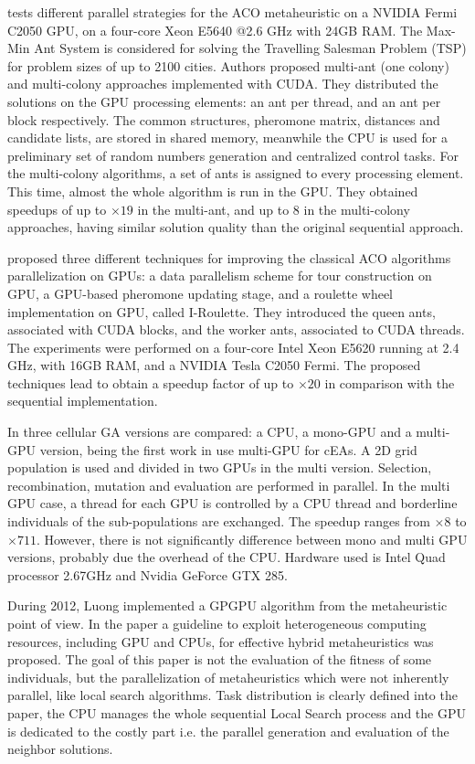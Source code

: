 \documentclass[Afour,sageh,times]{sagej}
\begin{document}
\cite{ACO-on-GPU_Develacq} tests different parallel strategies for the ACO metaheuristic on a NVIDIA Fermi C2050 GPU, on a four-core Xeon E5640 @2.6 GHz with 24GB RAM. The Max-Min Ant System is considered for solving the Travelling Salesman Problem (TSP) for problem sizes of up to 2100 cities. Authors proposed multi-ant (one colony) and multi-colony approaches implemented with CUDA. They distributed the solutions on the GPU processing elements: an ant per thread, and an ant per block respectively. The common structures, pheromone matrix, distances and candidate lists, are stored in shared memory, meanwhile the CPU is used for a preliminary set of random numbers generation and centralized control tasks. For the multi-colony algorithms, a set of ants is assigned to every processing element. This time, almost the whole algorithm is run in the GPU. They obtained speedups of up to $\times19$ in the multi-ant, and up to 8 in the multi-colony approaches, having similar solution quality than the original sequential approach.

\cite{Cecilia201342} proposed three different techniques for improving the classical ACO algorithms parallelization on GPUs: a data parallelism scheme for tour construction on GPU, a GPU-based pheromone updating stage, and a roulette wheel implementation on GPU, called I-Roulette. They introduced the queen ants, associated with CUDA blocks, and the worker ants, associated to CUDA threads. The experiments were performed on a four-core Intel Xeon E5620 running at 2.4 GHz, with 16GB RAM, and a NVIDIA Tesla C2050 Fermi. The proposed techniques lead to obtain a speedup factor of up to $\times20$ in comparison with the sequential implementation.

In \citep{5586530} three cellular GA versions are compared: a CPU, a mono-GPU and a multi-GPU version, being the first work in use multi-GPU for cEAs. A 2D grid population is used and divided in two GPUs in the multi version. Selection, recombination, mutation and evaluation are performed in parallel. In the multi GPU case, a thread for each GPU is controlled by a CPU thread and borderline individuals of the sub-populations are exchanged. The speedup ranges from $\times8$ to $\times711$. However, there is not significantly difference between mono and multi GPU versions, probably due the overhead of the CPU. Hardware used is Intel Quad processor 2.67GHz and Nvidia GeForce GTX 285.



During 2012, Luong \cite{luongMetaheuristicsPpsn2012} implemented a GPGPU algorithm from the metaheuristic point of view. In the paper a guideline to exploit heterogeneous computing resources, including GPU and CPUs, for effective hybrid metaheuristics was proposed. The goal of this paper is not the evaluation of the fitness of some individuals, but the parallelization of metaheuristics which were not inherently parallel, like local search algorithms. Task distribution is clearly defined into the paper, the CPU manages the whole sequential Local Search process and the GPU is dedicated to the costly part i.e. the parallel generation and evaluation of the neighbor solutions.
\end{document}
